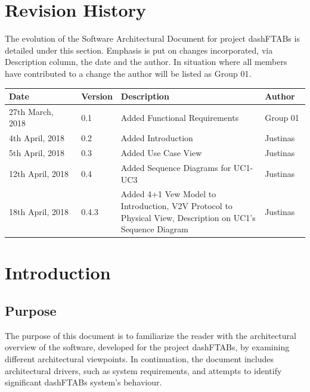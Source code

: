 \documentclass[12pt]{article}
\begin{document}
\section{Revision History}
The evolution of the Software Architectural Document for project dashFTABs is detailed under this section. Emphasis is put on changes incorporated, via Description column, the date and the author. In situation where all members have contributed to a change the author will be listed as Group 01.
\begin{longtable}{ | p{0.25\linewidth} | p{0.1\linewidth} | p{0.5\linewidth} | p{0.15\linewidth} | }\hline 
    Date & Version & Description & Author \\ \hline
   	27th March, 2018 & 0.1 & Added Functional Requirements & Group 01\\ \hline
   	4th April, 2018 & 0.2 & Added Introduction & Justinas\\ \hline
   	5th April, 2018 & 0.3 & Added Use Case View & Justinas\\ \hline
   	12th April, 2018 & 0.4 & Added Sequence Diagrams for UC1-UC3 & Justinas\\ \hline
    18th April, 2018 & 0.4.3 & Added 4+1 Vew Model to Introduction, V2V Protocol to Physical View, Description on UC1's Sequence Diagram & Justinas\\ \hline
\end{longtable}
\pagebreak

\section{Introduction}
\subsection{Purpose}
The purpose of this document is to familiarize the reader with the architectural overview of the software, developed for the project dashFTABs, by examining different architectural viewpoints. In continuation, the document includes architectural drivers, such as system requirements, and attempts to identify significant dashFTABs system’s behaviour.\par
\end{document}
